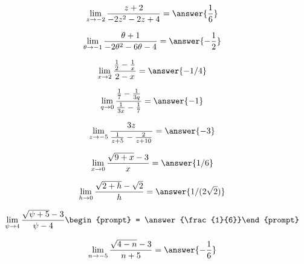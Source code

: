 \documentclass[handout]{ximera}
\begin{document}
\begin{exercise}
\[
\lim_{z\to -2 } \frac{z+2}{-2 z^2-2 z+4} = \answer{\frac{1}{6}}
\]
\end{exercise}


\begin{exercise}
\[
\lim_{\theta\to -1 } \frac{\theta +1}{-2 \theta ^2-6 \theta -4} = \answer{-\frac{1}{2}}
\]
\end{exercise}

\begin{exercise}
\[\lim_{x \to 2} \frac{\frac{1}{2}-\frac{1}{x}}{2-x} = \answer{-1/4}\]
\end{exercise}

\begin{exercise}
\[\lim_{q \to 0} \frac{\frac{1}{7}-\frac{1}{3q}}{\frac{1}{3x}-\frac{1}{7}} = \answer{-1}\]
\end{exercise}

\begin{exercise}
\[\lim_{z \to -5} \frac{3z}{\frac{1}{z+5}-\frac{2}{z+10}} = \answer{-3}\]
\end{exercise}

\begin{exercise}
\[\lim_{x \to 0} \frac{\sqrt{9+x}-3}{x} = \answer{1/6}\]

\end{exercise}

\begin{exercise}
	\[\lim_{h \to 0} \frac{\sqrt{2+h} - \sqrt{2}}{h} = \answer{1/(2\sqrt{2})}\]

\end{exercise}

\begin{exercise}
\[
\lim_{\psi\to 4 } \frac{\sqrt{\psi +5}-3}{\psi -4}\begin{prompt} = \answer{\frac{1}{6}}\end{prompt}
\]
\end{exercise}

\begin{exercise}
\[
\lim_{n\to -5 } \frac{\sqrt{4-n}-3}{n+5}= \answer{-\frac{1}{6}}
\]
\end{exercise}
\end{document}
